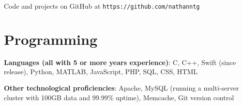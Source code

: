 \bigskip

\noindent
	Code and projects on GitHub at \texttt{https://github.com/nathanntg}
	

\section*{Programming} 

	\textbf{Languages (all with 5 or more years experience)}: C, C++, Swift (since release), Python, MATLAB, JavaScript, PHP, SQL, CSS, HTML

\bigskip

\noindent
	\textbf{Other technological proficiencies}: Apache, MySQL (running a multi-server cluster with 100GB data and 99.99\% uptime), Memcache, Git version control
